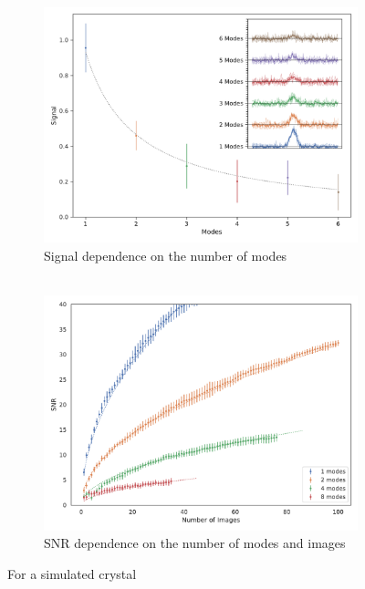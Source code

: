 \begin{figure}
	\centering
	\begin{subfigure}[b]{0.45\textwidth}
		\includegraphics[width=\linewidth]{images/modes_signal.pdf}
		\caption{Signal dependence on the number of modes\\ ${}$}
		\label{fig:modes}
	\end{subfigure}
	\hspace{0.02\textwidth}
	\begin{subfigure}[b]{0.45\textwidth}
	\includegraphics[width=\linewidth]{images/SNRNimagesgrating.pdf}
	\caption{SNR dependence on the number of modes and images}
	\label{fig:SNRNimages}
\end{subfigure}
\caption[SNR dependence on the number of modes and images]{For a simulated crystal
}
\end{figure}
